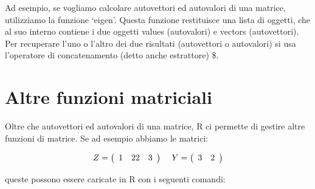 \documentclass[a4paper,12pt,oneside]{book}
\newenvironment{Shaded}{\begin{snugshade}}{\end{snugshade}}
\newcommand{\KeywordTok}[1]{\textcolor[rgb]{0.13,0.29,0.53}{\textbf{#1}}}
\newcommand{\DecValTok}[1]{\textcolor[rgb]{0.00,0.00,0.81}{#1}}
\newcommand{\StringTok}[1]{\textcolor[rgb]{0.31,0.60,0.02}{#1}}
\newcommand{\OperatorTok}[1]{\textcolor[rgb]{0.81,0.36,0.00}{\textbf{#1}}}
\newcommand{\NormalTok}[1]{#1}
\theoremstyle{definition}
\theoremstyle{definition}
\theoremstyle{definition}
\theoremstyle{remark}
\begin{document}
Ad esempio, se vogliamo calcolare autovettori ed autovalori di una
matrice, utilizziamo la funzione `eigen'. Questa funzione restituisce
una lista di oggetti, che al suo interno contiene i due oggetti values
(autovalori) e vectors (autovettori). Per recuperare l'uno o l'altro dei
due risultati (autovettori o autovalori) si usa l'operatore di
concatenamento (detto anche estrattore) \$.

\begin{Shaded}
\end{Shaded}

\section*{Altre funzioni matriciali}\label{altre-funzioni-matriciali}

Oltre che autovettori ed autovalori di una matrice, R ci permette di
gestire altre funzioni di matrice. Se ad esempio abbiamo le matrici:

\[
Z = \left( {\begin{array}{*{20}c}
   1 & 2  
   2 & 3  
\end{array}} \right)\,\,\,\,\,\,\,Y = \left( {\begin{array}{*{20}c}
   3 & 2  
\end{array}} \right)
\]

queste possono essere caricate in R con i seguenti comandi:
\end{document}
